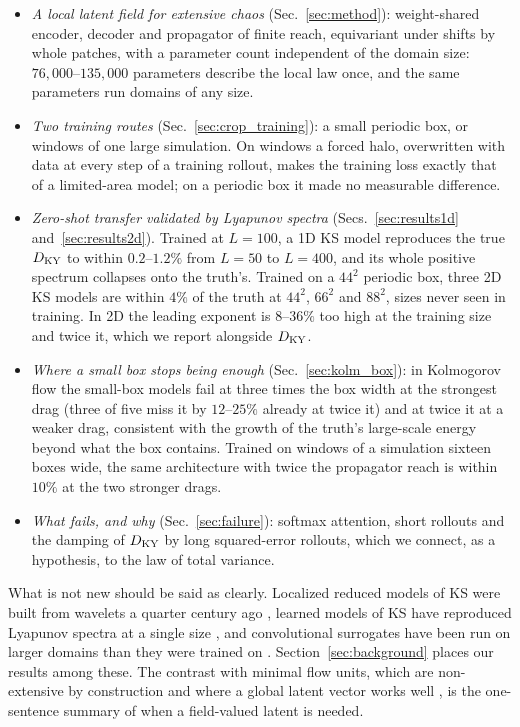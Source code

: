 \begin{itemize}
\item \emph{A local latent field for extensive chaos}
  (Sec.~\ref{sec:method}): weight-shared encoder, decoder and propagator
  of finite reach, equivariant under shifts by whole patches, with a
  parameter count independent of the domain size: $76{,}000$--$135{,}000$
  parameters describe the local law once, and the same parameters run
  domains of any size.
\item \emph{Two training routes}
  (Sec.~\ref{sec:crop_training}): a small periodic box, or windows of one
  large simulation. On windows a forced halo, overwritten with data at
  every step of a training rollout, makes the training loss exactly that
  of a limited-area model; on a periodic box it made no measurable
  difference.
\item \emph{Zero-shot transfer validated by Lyapunov spectra}
  (Secs.~\ref{sec:results1d} and~\ref{sec:results2d}). Trained at $L=100$,
  a 1D KS model reproduces the true $D_{\mathrm{KY}}$ to within $0.2$--$1.2\%$ from
  $L=50$ to $L=400$, and its whole positive spectrum collapses onto the
  truth's. Trained on a $44^2$ periodic box, three 2D KS models are within
  $4\%$ of the truth at $44^2$, $66^2$ and $88^2$, sizes never seen in training.
  In 2D the leading exponent is $8$--$36\%$ too high at the training size
  and twice it, which we report alongside $D_{\mathrm{KY}}$.
\item \emph{Where a small box stops being enough}
  (Sec.~\ref{sec:kolm_box}): in Kolmogorov flow the small-box models fail
  at three times the box width at the strongest drag (three of five miss
  it by $12$--$25\%$ already at twice it) and at twice it at a weaker drag, consistent with
  the growth of the truth's large-scale energy beyond what the box
  contains. Trained on windows of a simulation sixteen boxes wide, the
  same architecture with twice the propagator reach is within $10\%$ at the
  two stronger drags.
\item \emph{What fails, and why} (Sec.~\ref{sec:failure}): softmax
  attention, short rollouts and the damping of $D_{\mathrm{KY}}$ by long
  squared-error rollouts, which we connect, as a hypothesis, to the law of
  total variance.
\end{itemize}

What is not new should be said as clearly. Localized reduced models of KS
were built from wavelets a quarter century ago \citep{wittenberg2001},
learned models of KS have reproduced Lyapunov spectra at a single size
\citep{pathak2017,vlachas2020,ozalpmagri2025}, and convolutional
surrogates have been run on larger domains than they were trained on
\citep{barsinai2019,kochkov2021}. Section~\ref{sec:background} places our
results among these. The contrast with minimal flow units, which are
non-extensive by construction and where a global latent vector works
well \citep{constanteamores2025}, is the one-sentence summary of when a
field-valued latent is needed.

